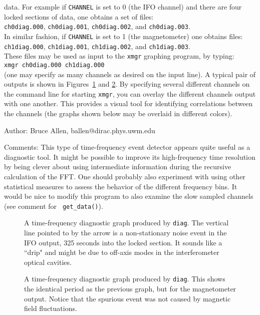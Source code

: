 data.  For example if {\tt CHANNEL} is set to 0 (the IFO channel)
and there are four locked sections of data, one obtains a set of
files:\\
{\tt ch0diag.000}, 
{\tt ch0diag.001}, 
{\tt ch0diag.002}, and
{\tt ch0diag.003}.\\
In similar fashion, if {\tt CHANNEL} is set to 1 (the magnetometer)
one obtains files:\\
{\tt ch1diag.000}, 
{\tt ch1diag.001}, 
{\tt ch1diag.002}, and
{\tt ch1diag.003}.\\
These files may be used as input to the {\tt xmgr} graphing program,
by typing:\\
{\tt xmgr ch0diag.000 ch1diag.000}\\
(one may specify as many channels as desired on the input line).  A
typical pair of outputs is shown in Figures~\ref{f:diag0F} and
\ref{f:diag1F}.  By specifying several different channels on the command
line for starting {\tt xmgr}, you can overlay the different channels
output with one another.  This provides a visual tool for identifying
correlations between the channels (the graphs shown below may be
overlaid in different colors).
\begin{description}
\item{Author:}
Bruce Allen, ballen@dirac.phys.uwm.edu
\item{Comments:}
This type of time-frequency event detector appears quite useful as a
diagnostic tool.  It might be possible to improve its high-frequency
time resolution by being clever about using intermediate information
during the recursive calculation of the FFT.  One should probably also
experiment with using other statistical measures to assess the behavior
of the different frequency bins.  It would be nice to modify this
program to also examine the slow sampled channels (see comment for {\tt
get\_data()}).
\end{description}
\begin{figure}[t]
\begin{center}
\caption{ \label{f:diag0F} A time-frequency diagnostic graph produced by
{\tt diag}.  The vertical line pointed to by the arrow is a
non-stationary noise event in the IFO output, 325 seconds into the
locked section.  It sounds like a ``drip" and might be due to off-axis
modes in the interferometer optical cavities.}
\end{center}
\end{figure}
\begin{figure}[b]
\begin{center}
\caption{ \label{f:diag1F} A time-frequency diagnostic graph
produced by {\tt diag}.  This shows the identical period as the previous
graph, but for the magnetometer output.  Notice that the spurious event
was not caused by magnetic field fluctuations.}
\end{center}
\end{figure}
\clearpage

